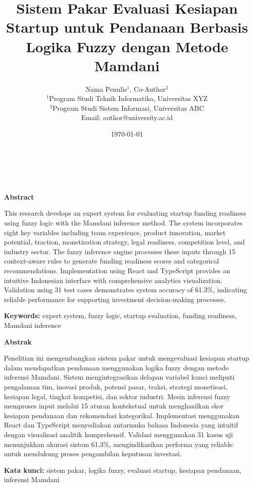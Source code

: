 \documentclass[12pt,a4paper]{article}
\title{Sistem Pakar Evaluasi Kesiapan Startup untuk Pendanaan Berbasis Logika Fuzzy dengan Metode Mamdani}
\author{%
    \small Nama Penulis$^{1}$, Co-Author$^{2}$\\
    \small $^{1}$Program Studi Teknik Informatika, Universitas XYZ\\
    \small $^{2}$Program Studi Sistem Informasi, Universitas ABC\\
    \small Email: author@university.ac.id
}
\date{\small \today}
\makeatletter
\renewcommand{\maketitle}{%
    \begin{center}
        {\Large\textbf{\@title}}\\[0.3cm]
        {\normalsize\@author}\\[0.2cm]
        {\small\@date}
    \end{center}
    \vspace{1cm} %
}
\makeatother
\begin{document}
\maketitle

\begin{center}
    \textbf{Abstract}
\end{center}

\noindent This research develops an expert system for evaluating startup funding readiness using fuzzy logic with the Mamdani inference method. The system incorporates eight key variables including team experience, product innovation, market potential, traction, monetization strategy, legal readiness, competition level, and industry sector. The fuzzy inference engine processes these inputs through 15 context-aware rules to generate funding readiness scores and categorical recommendations. Implementation using React and TypeScript provides an intuitive Indonesian interface with comprehensive analytics visualization. Validation using 31 test cases demonstrates system accuracy of 61.3\%, indicating reliable performance for supporting investment decision-making processes.

\textbf{Keywords:} expert system, fuzzy logic, startup evaluation, funding readiness, Mamdani inference

\vspace{1cm} %

\begin{center}
    \textbf{Abstrak}
\end{center}

\noindent Penelitian ini mengembangkan sistem pakar untuk mengevaluasi kesiapan startup dalam mendapatkan pendanaan menggunakan logika fuzzy dengan metode inferensi Mamdani. Sistem mengintegrasikan delapan variabel kunci meliputi pengalaman tim, inovasi produk, potensi pasar, traksi, strategi monetisasi, kesiapan legal, tingkat kompetisi, dan sektor industri. Mesin inferensi fuzzy memproses input melalui 15 aturan kontekstual untuk menghasilkan skor kesiapan pendanaan dan rekomendasi kategorikal. Implementasi menggunakan React dan TypeScript menyediakan antarmuka bahasa Indonesia yang intuitif dengan visualisasi analitik komprehensif. Validasi menggunakan 31 kasus uji menunjukkan akurasi sistem 61,3\%, mengindikasikan performa yang reliable untuk mendukung proses pengambilan keputusan investasi.

\textbf{Kata kunci:} sistem pakar, logika fuzzy, evaluasi startup, kesiapan pendanaan, inferensi Mamdani
\end{document}
